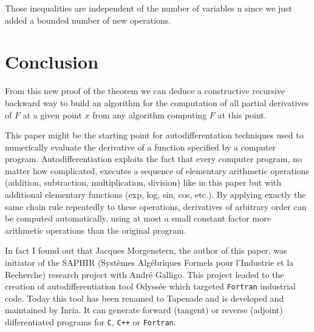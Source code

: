 \vskip 0.5cm

Those inequalities are independent of the number of variables n since we just added a bounded number of new operations.

\section{Conclusion}

From this new proof of the theorem we can deduce a constructive recursive backward way to build an algorithm for the computation of all partial derivatives of $F$ at a given point $x$ from any algorithm computing $F$ at this point.

\vskip 0.3cm
This paper might be the starting point for autodifferentation techniques used to numerically evaluate the derivative of a function specified by a computer program.
Autodifferentiation exploits the fact that every computer program,
no matter how complicated,
executes a sequence of elementary arithmetic operations 
(addition,
subtraction,
multiplication,
division)
like in this paper but with additional elementary functions 
(exp,
log,
sin,
cos,
etc.).
By applying exactly the same chain rule repeatedly to these operations,
derivatives of arbitrary order can be computed automatically,
using at most a small constant factor more arithmetic operations than the original program.


\vskip 0.3cm
In fact I found out that Jacques Morgenstern, the author of this paper, was initiator of the SAPHIR (Systèmes Algébriques Formels pour l'Industrie et la Recherche) research project with André Galligo. 
This project leaded to the creation of autodifferentiation tool Odyssée which targeted \verb!Fortran! industrial code.
Today this tool has been renamed to Tapenade and is developed and maintained by Inria. It can generate forward (tangent) or reverse (adjoint) differentiated programs for \verb!C!, \verb!C++! or \verb!Fortran!. 





